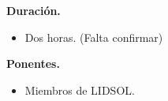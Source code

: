 \documentclass[a4paper,11pt]{article}                 %
\begin{document}
  \textbf{Duración.}
  \begin{itemize}
    \item Dos horas. (Falta confirmar)
  \end{itemize}
  
            \textbf{Ponentes.}
  \begin{itemize}
    \item Miembros de LIDSOL.
  \end{itemize}
  


\end{document}
